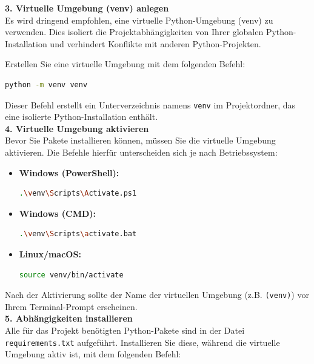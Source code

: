 \documentclass[a4paper, portrait, 12pt]{scrartcl} %
\begin{document}
\textbf{3. Virtuelle Umgebung (venv) anlegen}\\
Es wird dringend empfohlen, eine virtuelle Python-Umgebung (venv) zu verwenden. Dies isoliert die Projektabhängigkeiten von Ihrer globalen Python-Installation und verhindert Konflikte mit anderen Python-Projekten.

Erstellen Sie eine virtuelle Umgebung mit dem folgenden Befehl:

\begin{lstlisting}[language=bash, caption={Erstellen einer virtuellen Umgebung}]
python -m venv venv
\end{lstlisting}
Dieser Befehl erstellt ein Unterverzeichnis namens \texttt{venv} im Projektordner, das eine isolierte Python-Installation enthält.\\

\textbf{4. Virtuelle Umgebung aktivieren}\\
Bevor Sie Pakete installieren können, müssen Sie die virtuelle Umgebung aktivieren. Die Befehle hierfür unterscheiden sich je nach Betriebssystem:

\begin{itemize}
    \item \textbf{Windows (PowerShell):}
    \begin{lstlisting}[language=bash, caption={Aktivieren unter Windows (PowerShell)}]
.\venv\Scripts\Activate.ps1
    \end{lstlisting}
    \item \textbf{Windows (CMD):}
    \begin{lstlisting}[language=bash, caption={Aktivieren unter Windows (CMD)}]
.\venv\Scripts\activate.bat
    \end{lstlisting}
    \item \textbf{Linux/macOS:}
    \begin{lstlisting}[language=bash, caption={Aktivieren unter Linux/macOS}]
source venv/bin/activate
    \end{lstlisting}
\end{itemize}
Nach der Aktivierung sollte der Name der virtuellen Umgebung (z.B. \texttt{(venv)}) vor Ihrem Terminal-Prompt erscheinen.\\

\textbf{5. Abhängigkeiten installieren}\\
Alle für das Projekt benötigten Python-Pakete sind in der Datei \texttt{requirements.txt} aufgeführt. Installieren Sie diese, während die virtuelle Umgebung aktiv ist, mit dem folgenden Befehl:
\end{document}
